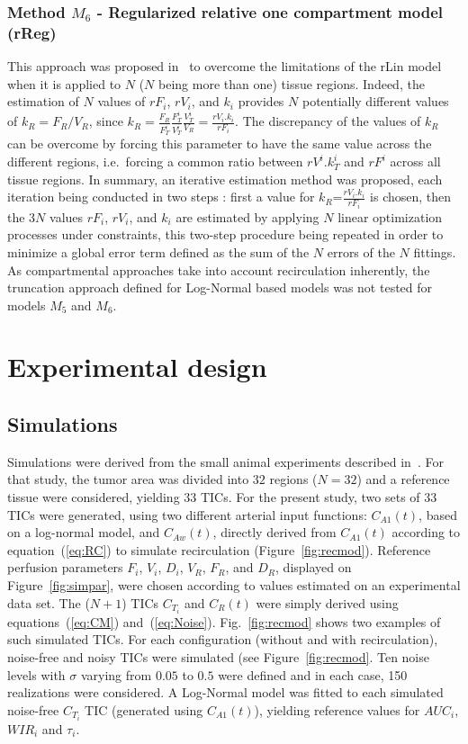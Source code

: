 \subsubsection{Method $M_6$ - Regularized relative one compartment model (rReg)}
This approach was proposed in~\cite{Doury:2016fi} to overcome the limitations of the rLin model when it is applied to $N$ ($N$ being more than one) tissue regions. Indeed, the estimation of $N$ values of $rF_i$, $rV_i$, and $k_i$ provides $N$ potentially different values of $k_R = F_R/V_R$, since $k_R = \frac{F_R}{F_T^i}\frac{F_T^i}{V_T^i}\frac{V_T^i}{V_R} = \frac{rV_i.k_i}{rF_i}$.
The discrepancy of the values of $k_R$ can be overcome by forcing this parameter to have the same value across the different regions, i.e.~forcing a common ratio between $rV^i.k^i_T$ and $rF^i$ across all tissue regions. In summary, an iterative estimation method was proposed, each iteration being conducted in two steps : first a value for $k_R$=$\frac{rV_i.k_i}{rF_i}$ is chosen, then the $3N$ values $rF_i$, $rV_i$, and $k_i$ are estimated by applying $N$ linear optimization processes under constraints, this two-step procedure being repeated in order to minimize a global error term defined as the sum of the $N$ errors of the $N$ fittings.
As compartmental approaches take into account recirculation inherently, the truncation approach defined for Log-Normal based models was not tested for models $M_5$ and $M_6$. 

\section{Experimental design}

\subsection{Simulations}
Simulations were derived from the small animal experiments described in~\cite{Doury:2017fz}. For that study, the tumor area was divided into $32$ regions ($N=32$) and a reference tissue were considered, yielding $33$ TICs. For the present study, two sets of 33 TICs were generated, using two different arterial input functions: $C_{A1}(t)$, based on a log-normal model, and $C_{Aw}(t)$, directly derived from $C_{A1}(t)$ according to equation~(\ref{eq:RC}) to simulate recirculation (Figure~\ref{fig:recmod}).
Reference perfusion parameters $F_i$, $V_i$, $D_i$, $V_R$, $F_R$, and $D_R$, displayed on Figure~\ref{fig:simpar}, were chosen according to values estimated on an experimental data set. The ($N+1$) TICs $C_{T_i}$ and $C_R(t)$ were simply derived using equations~(\ref{eq:CM}) and~(\ref{eq:Noise}). Fig.~\ref{fig:recmod} shows two examples of such simulated TICs.
For each configuration (without and with recirculation), noise-free and noisy TICs were simulated (see Figure~\ref{fig:recmod}. Ten noise levels with $\sigma$ varying from $0.05$ to $0.5$ were defined and in each case, 150 realizations were considered.
A Log-Normal model was fitted to each simulated noise-free $C_{T_i}$ TIC (generated using $C_{A1}(t)$), yielding reference values for $AUC_i$, $WIR_i$ and $\tau_i$. 

